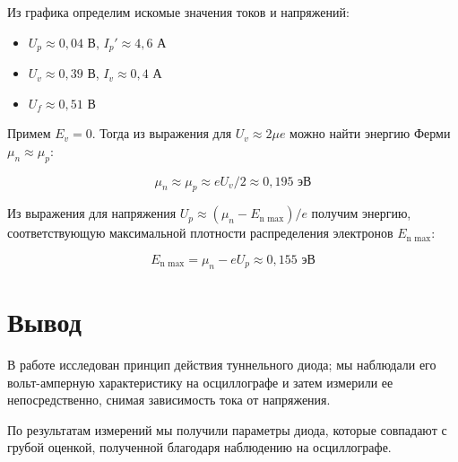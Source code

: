 \documentclass[12pt]{kiarticle}
\begin{document}
	Из графика определим искомые значения токов и напряжений:
	
	\begin{itemize}
		\item $ U_p \approx 0,04 $ В, $ I_p' \approx 4,6 $ А
		\item $ U_v \approx 0,39 $ В, $ I_v \approx 0,4 $ А
		\item $ U_f \approx 0,51 $ В
	\end{itemize} 

Примем $E_v = 0$. Тогда из выражения для $U_v \approx 2\mu e$ можно найти энергию Ферми $\mu_n \approx \mu_p$:

\[ \mu_n \approx \mu_p \approx eU_v/2 \approx 0,195 \text{ эВ} \]

Из выражения для напряжения $U_p \approx (\mu_n - E_\text{n max})/e$ получим энергию, соответствующую максимальной плотности распределения электронов $E_\text{n max}$:

\[ E_\text{n max} = \mu_n - eU_p \approx 0,155 \text{ эВ} \] 
	
	\section{Вывод} 
	В работе исследован принцип действия туннельного диода; мы наблюдали его вольт-амперную характеристику на осциллографе и затем измерили ее непосредственно, снимая зависимость тока от напряжения. 
	
	По результатам измерений мы получили параметры диода, которые совпадают с грубой оценкой, полученной благодаря наблюдению на осциллографе.
	
\end{document}
